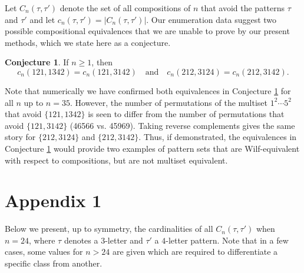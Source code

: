\documentclass[11pt]{amsart}
\theoremstyle{plain}
\theoremstyle{definition}
\newtheorem{conjecture}[theorem]{Conjecture}
\begin{document}
Let $C_n(\tau,\tau')$ denote the set of all compositions of $n$ that avoid the patterns $\tau$ and $\tau'$ and let $c_n(\tau,\tau')=|C_n(\tau,\tau')|$.  Our enumeration data suggest two possible compositional equivalences that we are unable to prove by our present
methods, which we state here as a conjecture.

\begin{conjecture}\label{121,1342}
If $n \geq 1$, then
$$c_n(121,1342)=c_n(121,3142) \quad\text{and}\quad c_n(212,3124)=c_n(212,3142).$$
\end{conjecture}

Note that numerically we have confirmed both equivalences in Conjecture \ref{121,1342} for all $n$ up to $n=35$.  However, the number of permutations of the multiset $1^2\cdots5^2$ that avoid $\{121,1342\}$ is seen to differ from the number of permutations that avoid $\{121,3142\}$  (46566 vs. 45969).  Taking reverse complements gives the same story for $\{212,3124\}$ and $\{212,3142\}$.  Thus, if demonstrated, the equivalences in Conjecture \ref{121,1342} would provide two examples of pattern sets that are Wilf-equivalent with respect to compositions, but are not multiset equivalent.

\section{Appendix 1}

Below we present, up to symmetry, the cardinalities of all $C_n(\tau,\tau')$ when $n=24$, where $\tau$ denotes a $3$-letter and $\tau'$ a $4$-letter pattern. Note that in a few cases, some values for $n>24$ are given which are required to differentiate a specific class from another.
\end{document}
